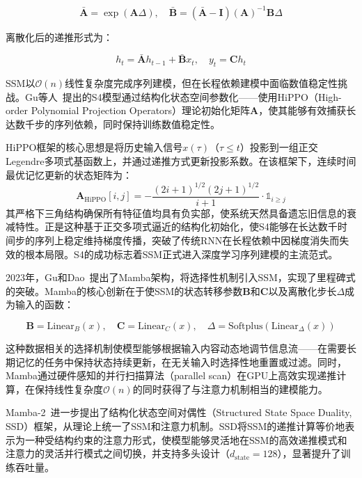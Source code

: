 \documentclass[12pt,a4paper]{article}
\numberwithin{equation}{section}
\numberwithin{figure}{section}
\numberwithin{table}{section}
\begin{document}
\begin{equation}
\bar{\mathbf{A}} = \exp(\mathbf{A} \Delta), \quad \bar{\mathbf{B}} = (\bar{\mathbf{A}} - \mathbf{I})(\mathbf{A})^{-1}\mathbf{B} \Delta
\label{eq:zoh}
\end{equation}

离散化后的递推形式为：

\begin{equation}
h_t = \bar{\mathbf{A}} h_{t-1} + \bar{\mathbf{B}} x_t, \quad y_t = \mathbf{C} h_t
\label{eq:ssm_discrete}
\end{equation}

SSM以$\mathcal{O}(n)$线性复杂度完成序列建模，但在长程依赖建模中面临数值稳定性挑战。Gu等人~\cite{gu2022s4}提出的S4模型通过结构化状态空间参数化——使用HiPPO（High-order Polynomial Projection Operators）理论初始化矩阵$\mathbf{A}$，使其能够有效捕获长达数千步的序列依赖，同时保持训练数值稳定性。

HiPPO框架的核心思想是将历史输入信号$x(\tau)$（$\tau \leq t$）投影到一组正交Legendre多项式基函数上，并通过递推方式更新投影系数。在该框架下，连续时间最优记忆更新的状态矩阵为：
\begin{equation}
\mathbf{A}_{\text{HiPPO}}[i,j] = -\frac{(2i+1)^{1/2}(2j+1)^{1/2}}{i+1} \cdot \mathbb{1}_{i \geq j}
\label{eq:hippo}
\end{equation}
其严格下三角结构确保所有特征值均具有负实部，使系统天然具备遗忘旧信息的衰减特性。正是这种基于正交多项式逼近的结构化初始化，使S4能够在长达数千时间步的序列上稳定维持梯度传播，突破了传统RNN在长程依赖中因梯度消失而失效的根本局限。S4的成功标志着SSM正式进入深度学习序列建模的主流范式。

2023年，Gu和Dao~\cite{gu2023mamba}提出了Mamba架构，将选择性机制引入SSM，实现了里程碑式的突破。Mamba的核心创新在于使SSM的状态转移参数$\mathbf{B}$和$\mathbf{C}$以及离散化步长$\Delta$成为输入的函数：

\begin{equation}
\mathbf{B} = \text{Linear}_B(x), \quad \mathbf{C} = \text{Linear}_C(x), \quad \Delta = \text{Softplus}(\text{Linear}_\Delta(x))
\label{eq:mamba_selective}
\end{equation}

这种数据相关的选择机制使模型能够根据输入内容动态地调节信息流——在需要长期记忆的任务中保持状态持续更新，在无关输入时选择性地重置或过滤。同时，Mamba通过硬件感知的并行扫描算法（parallel scan）在GPU上高效实现递推计算，在保持线性复杂度$\mathcal{O}(n)$的同时获得了与注意力机制相当的建模能力。

Mamba-2~\cite{dao2024mamba2}进一步提出了结构化状态空间对偶性（Structured State Space Duality, SSD）框架，从理论上统一了SSM和注意力机制。SSD将SSM的递推计算等价地表示为一种受结构约束的注意力形式，使模型能够灵活地在SSM的高效递推模式和注意力的灵活并行模式之间切换，并支持多头设计（$d_{\text{state}}=128$），显著提升了训练吞吐量。
\end{document}
